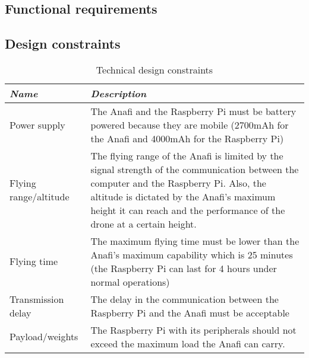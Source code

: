 \documentclass[../main.tex]{subfiles}
\begin{document}
\subsection{Functional requirements}

\blindtext
\newpage
\subsection{Design constraints}

\begin{table}[hbt!]
    \centering
    \caption{Technical design constraints}
    \label{tab:technical-design-constraints}
    \begin{tabular}{ P{2.8cm} P{12.2cm} }
        \toprule
        \textit{Name} 
            & \textit{Description} \\

        \midrule

        Power supply  
            & The Anafi and the Raspberry Pi must be 
            battery powered because they are mobile 
            (2700mAh for the Anafi 
            and 4000mAh for the Raspberry Pi)  \\

        Flying range/altitude 
            & The flying range of the Anafi is limited 
            by the signal strength of the communication 
            between the computer and the Raspberry Pi. 
            Also, the altitude is dictated by the Anafi’s 
            maximum height it can reach and the performance 
            of the drone at a certain height. \\

        Flying time  
            & The maximum flying time must be lower than 
            the Anafi’s maximum capability which is 25 minutes 
            (the Raspberry Pi can last for 4 hours under normal
            operations) \\ 

        Transmission delay  
            & The delay in the communication between 
            the Raspberry Pi and the Anafi must be acceptable \\

        Payload/weights  
            & The Raspberry Pi with its peripherals should not 
            exceed the maximum load the Anafi can carry. \\

        \bottomrule
    \end{tabular}
\end{table}
\end{document}
